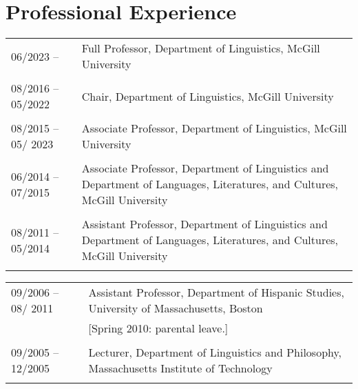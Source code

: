 \documentclass[11pt]{article}
\begin{document}
\section*{Professional Experience}

\begin{tabular}{p{2.815cm}p{280pt}}
06/2023 -- & Full Professor, Department of Linguistics, McGill University\\
  & \\[-8pt]
08/2016 -- 05/2022 &  Chair, Department of Linguistics, McGill University\\
 & \\[-8pt]
08/2015 -- 05/ 2023& Associate Professor, Department of Linguistics, McGill University\\
  & \\[-8pt]
06/2014 -- 07/2015&  Associate Professor, Department of Linguistics and Department of Languages, Literatures, and Cultures, McGill University\\
& \\[-8pt]
08/2011 -- 05/2014&  Assistant Professor, Department of Linguistics and Department of Languages, Literatures, and Cultures, McGill University\\
& \\[-8pt]
\end{tabular}
\begin{tabular}{p{2.815cm}p{280pt}}
09/2006 -- 08/ 2011& Assistant Professor, Department of
Hispanic Studies, University of Massachusetts, Boston\\
 &  \footnotesize{[Spring 2010: parental leave.]}\\
& \\[-8pt]
09/2005 -- 12/2005 & Lecturer, Department of Linguistics and Philosophy, Massachusetts Institute of Technology\\
& \\[-8pt]
\end{tabular}
\end{document}
